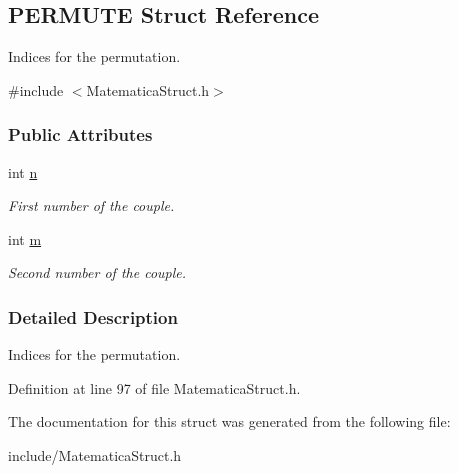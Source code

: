 \hypertarget{structPERMUTE}{\subsection{\-P\-E\-R\-M\-U\-T\-E \-Struct \-Reference}
\label{structPERMUTE}
}


\-Indices for the permutation.  




{\ttfamily \#include $<$\-Matematica\-Struct.\-h$>$}

\subsubsection*{\-Public \-Attributes}
\begin{DoxyCompactItemize}
\item 
\hypertarget{structPERMUTE_a76f11d9a0a47b94f72c2d0e77fb32240}{int \hyperlink{structPERMUTE_a76f11d9a0a47b94f72c2d0e77fb32240}{n}}\label{structPERMUTE_a76f11d9a0a47b94f72c2d0e77fb32240}

\begin{DoxyCompactList}\small\item\em \-First number of the couple. \end{DoxyCompactList}\item 
\hypertarget{structPERMUTE_a742204794ea328ba293fe59cec79b990}{int \hyperlink{structPERMUTE_a742204794ea328ba293fe59cec79b990}{m}}\label{structPERMUTE_a742204794ea328ba293fe59cec79b990}

\begin{DoxyCompactList}\small\item\em \-Second number of the couple. \end{DoxyCompactList}\end{DoxyCompactItemize}


\subsubsection{\-Detailed \-Description}
\-Indices for the permutation. 

\-Definition at line 97 of file \-Matematica\-Struct.\-h.



\-The documentation for this struct was generated from the following file\-:\begin{DoxyCompactItemize}
\item 
include/\-Matematica\-Struct.\-h\end{DoxyCompactItemize}
